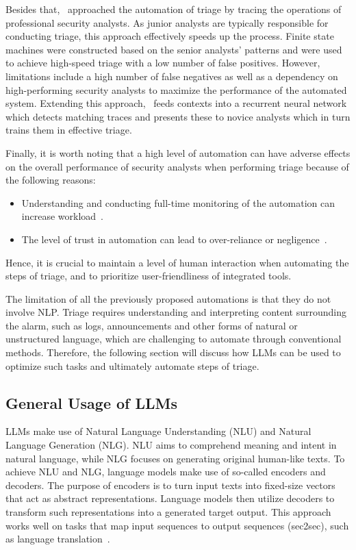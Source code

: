 Besides that,\ \citet{zhong2018learning} approached the automation of triage by tracing the operations of professional
security analysts.
As junior analysts are typically responsible for conducting triage, this approach effectively speeds up the process.
Finite state machines were constructed based on the senior analysts' patterns and were used to achieve high-speed triage
with a low number of false positives.
However, limitations include a high number of false negatives as well as a dependency on high-performing security
analysts to maximize the performance of the automated system.
Extending this approach,\ \citet{lin2018data} feeds contexts into a recurrent neural network which detects matching
traces and presents these to novice analysts which in turn trains them in effective triage.

Finally, it is worth noting that a high level of automation can have adverse effects on the overall performance of
security analysts when performing triage because of the following reasons:
\begin{itemize}
    \item Understanding and conducting full-time monitoring of the automation can increase
    workload\ \citep{kaber2004effects}.
    \item The level of trust in automation can lead to over-reliance or negligence\ \citep{lee2004trust}.
\end{itemize}
Hence, it is crucial to maintain a level of human interaction when automating the steps of triage, and to prioritize
user-friendliness of integrated tools.

The limitation of all the previously proposed automations is that they do not involve NLP\@.
Triage requires understanding and interpreting content surrounding the alarm, such as logs, announcements and other
forms of natural or unstructured language, which are challenging to automate through conventional methods.
Therefore, the following section will discuss how LLMs can be used to optimize such tasks and ultimately automate steps
of triage.

\subsection{General Usage of LLMs}
\label{subsec:rq1-use-of-llms}

LLMs make use of Natural Language Understanding (NLU) and Natural Language Generation (NLG).
NLU aims to comprehend meaning and intent in natural language, while NLG focuses on generating original human-like
texts.
To achieve NLU and NLG, language models make use of so-called encoders and decoders.
The purpose of encoders is to turn input texts into fixed-size vectors that act as abstract representations.
Language models then utilize decoders to transform such representations into a generated target output.
This approach works well on tasks that map input sequences to output sequences (sec2sec), such as language
translation\ \citep{sutskever2014sequence, cho2014learning}.


